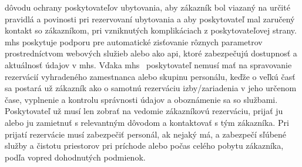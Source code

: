 dôvodu ochrany poskytovateľov ubytovania, aby zákazník bol viazaný na 
určité pravidlá a povinosti pri rezervovaní ubytovania a aby poskytovateľ 
mal zaručený kontakt so zákazníkom, pri vzniknutých komplikáciach z 
poskytovateľovej strany. \acrshort{mhs} poskytuje podporu pre automatické 
zisťovanie rôznych parametrov prostredníctvom webových služieb alebo ako 
\acrfull{api}, ktoré zabezpečujú dostupnosť a aktuálnosť údajov v 
\acrshort{mhs}. Vďaka \acrshort{mhs} \projectName\ poskytovateľ nemusí mať 
na spravovanie rezervácií vyhradeného zamestnanca alebo skupinu personálu, 
keďže o veľkú časť sa postará už zákazník ako o samotnú rezerváciu 
izby/zariadenia v jeho určenom čase, vyplnenie a kontrolu správnosti údajov 
a oboznámenie sa so službami. Poskytovateľ už musí len zobrať na vedomie 
zákazníkovú rezerváciu, prijať ju alebo ju zamietnuť s relevantným dôvodom 
a kontaktovať s tým zákazníka. Pri prijatí rezervácie musí zabezpečiť 
personál, ak nejaký má, a zabezpečí sľúbené služby a čistotu priestorov 
pri príchode alebo počas celého pobytu zákazníka, podľa vopred dohodnutých 
podmienok.

\newpage

